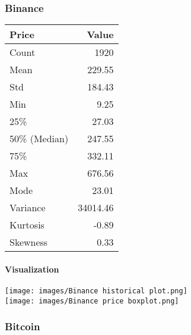 \documentclass{ieeeojies}
\begin{document}
\subsubsection{Binance}
\vspace{0.5cm}
\begin{center}
\begin{tabular}{|l|r|}
\hline
\textbf{Price} & \textbf{Value} \\
\hline
Count & 1920 \\
\hline
Mean & 229.55 \\
\hline
Std & 184.43 \\
\hline
Min & 9.25 \\
\hline
25\% & 27.03 \\
\hline
50\% (Median) & 247.55 \\
\hline
75\% & 332.11 \\
\hline
Max & 676.56 \\
\hline
Mode & 23.01 \\
\hline
Variance & 34014.46 \\
\hline
Kurtosis & -0.89 \\
\hline
Skewness & 0.33 \\
\hline
\end{tabular}
\end{center}
\paragraph{Visualization}
\texttt{[image: images/Binance historical plot.png]}\\
\texttt{[image: images/Binance price boxplot.png]}
\subsubsection{Bitcoin}
\end{document}
